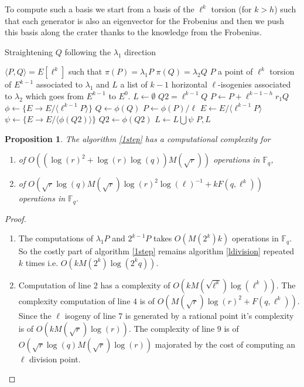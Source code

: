 \documentclass{lms}
\newtheorem{prop}[thm]{Proposition}
\begin{document}
To compute such a basis we start from a basis of the $\ell^{k}$ torsion (for $k > h$) such that each generator is also an eigenvector for the Frobenius and then we push this basis along the crater thanks to the knowledge from the Frobenius.

\begin{algorithm}
\caption{\label{1step}Straightening $Q$ following the $\lambda_1$ direction}
\begin{algorithmic}[5]
\REQUIRE $\langle P,Q \rangle = E[\ell^k]$ such that $\pi(P)=\lambda_1P$ $ \pi(Q)=\lambda_2Q$
\ENSURE $P$ a point of $\ell^k$ torsion of $E^{k-1}$ associated to $\lambda_1$ and $L$ a list of $k-1$ horizontal $\ell$-isogenies associated to $\lambda_2$ which goes from $E^{k-1}$ to $E^0$.
\STATE $L \gets \emptyset$
\STATE $Q2= \ell^{k-1}Q$
\STATE $P \gets P+\ell^{k-1-h}r_1Q$
\ENDIF
\STATE $\phi \leftarrow \{ E \rightarrow E/ \langle \ell^{k-1}P \rangle \}$
\STATE $Q \leftarrow \phi(Q)$
\STATE $P \leftarrow \phi(P)/ \ell$
\STATE $E \leftarrow E/ \langle \ell^{k-1}P \rangle$
\STATE $\psi \leftarrow \{ E \rightarrow E/ \langle \phi(Q2) \rangle \}$
\STATE $Q2 \gets \phi(Q2)$
\STATE $L \gets L \bigcup \psi$
\ENDFOR
\RETURN $P,L$
\end{algorithmic}
\end{algorithm}

\begin{prop}
The algorithm \ref{1step} has a computational complexity for
\begin{enumerate}
\item[$\ell =2$] of $O((\log(r)^2+\log(r)\log(q))M(\sqrt{r}))$ operations in $\mathbb{F}_q$,
 \item[$\ell \neq 2$] of $O(\sqrt{r}\log(q)M(\sqrt{r})\log(r)^2 \log(\ell)^{-1}+kF(q,\ell^k))$ operations in $\mathbb{F}_q$.
 
\end{enumerate}
\end{prop}

\begin{proof}
\begin{enumerate}
\item[$\ell=2$] The computations of $\lambda_1P$ and $2^{k-1}P$ takes  $O(M(2^k)k)$ operations in $\mathbb{F}_q$. So the costly part of algorithm \ref{1step} remains algorithm \ref{ldivision} repeated $k$ times i.e. $O(kM(2^k)\log(2^kq))$. 
\item[$\ell \neq 2$] Computation of line $2$ has a complexity of $O(kM(\sqrt{\ell^k})\log(\ell^k))$. The complexity computation of line $4$ is of $O(M(\sqrt{r})\log(r)^2+ F(q,\ell^k))$. Since the $\ell$ isogeny of line $7$ is generated by a rational point it's complexity is of $O(kM(\sqrt{r})\log(r))$. The complexity of line $9$ is of $O(\sqrt{r}\log(q)M(\sqrt{r})\log(r))$ majorated by the cost of computing an $\ell$ division point.
\end{enumerate} 
\end{proof}
\end{document}
